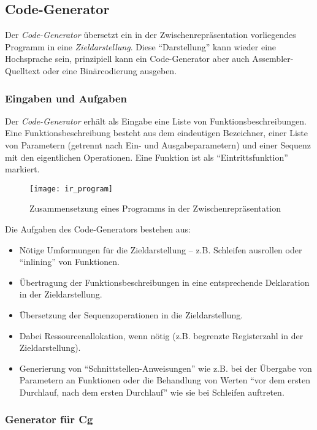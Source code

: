 \documentclass[twoside,a4paper,fleqn,12pt]{article}
\begin{document}

\subsection{Code-Generator}

Der \emph{Code-Generator} übersetzt ein in der Zwischenrepräsentation vorliegendes Programm in eine \emph{Zieldarstellung}.
Diese "`Darstellung"' kann wieder eine Hochsprache sein, prinzipiell kann ein Code-Generator aber auch Assembler-Quelltext oder eine
Binärcodierung ausgeben.

\subsubsection{Eingaben und Aufgaben}

Der \emph{Code-Generator} erhält als Eingabe eine Liste von Funktionsbeschreibungen.
Eine Funktionsbeschreibung besteht aus dem eindeutigen Bezeichner, einer Liste von Parametern (getrennt nach Ein- und Ausgabeparametern)
und einer Sequenz mit den eigentlichen Operationen. Eine Funktion ist als "`Eintrittsfunktion"' markiert.

\begin{figure}[h]
   \centering
  \texttt{[image: ir\_program]}
  \caption{Zusammensetzung eines Programms in der Zwischenrepräsentation}
  \label{fig:ir_program}
\end{figure}

Die Aufgaben des Code-Generators bestehen aus:
\begin{itemize}
\item Nötige Umformungen für die Zieldarstellung -- z.B. Schleifen ausrollen oder ``inlining'' von Funktionen.
\item Übertragung der Funktionsbeschreibungen in eine entsprechende Deklaration in der Zieldarstellung.
\item Übersetzung der Sequenzoperationen in die Zieldarstellung. 
\item Dabei Ressourcenallokation, wenn nötig (z.B. begrenzte Registerzahl in der Zieldarstellung).
\item Generierung von "`Schnittstellen-Anweisungen"' wie z.B. bei der Übergabe von Parametern an Funktionen
oder die Behandlung von Werten "`vor dem ersten Durchlauf, nach dem ersten Durchlauf"' wie sie bei Schleifen
auftreten.
\end{itemize}

\subsubsection{Generator für Cg}
\end{document}
